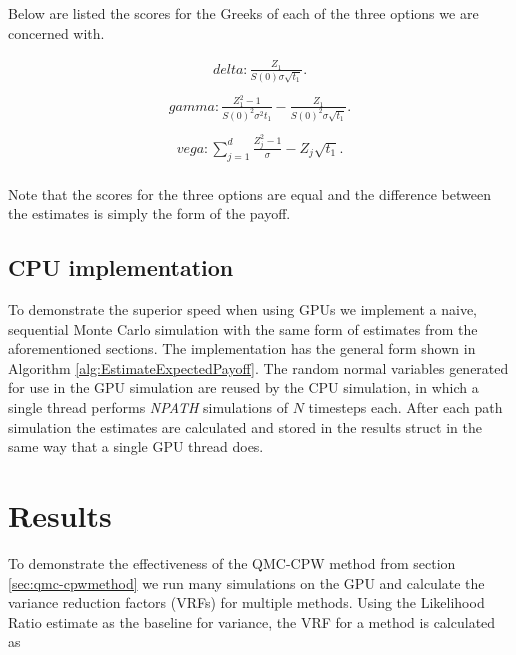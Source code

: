 Below are listed the scores for the Greeks of each of the three options we are concerned with.

\begin{equation*}
\begin{aligned}
    delta: \frac{Z_1}{S(0)\sigma\sqrt{t_1}}. \\[10pt]
\end{aligned}
\end{equation*}
\begin{equation*}
\begin{aligned}
    gamma: \frac{Z_1^2 - 1}{{S(0)}^2 \sigma^2 t_1} - \frac{Z_1}{{S(0)}^2 \sigma \sqrt{t_1}}. \\[10pt]
\end{aligned}
\end{equation*}
\begin{equation*}
\begin{aligned}
    vega: \sum_{j=1}^d{\frac{Z_j^2 - 1}{\sigma} - Z_j\sqrt{t_1}}. \\[10pt]
\end{aligned}
\end{equation*}

Note that the scores for the three options are equal and the difference between the estimates is simply the form of the payoff.

\section{CPU implementation}
To demonstrate the superior speed when using GPUs we implement a naive, sequential Monte Carlo simulation with the same form of estimates from the aforementioned sections. The implementation has the general form shown in Algorithm \ref{alg:EstimateExpectedPayoff}. The random normal variables generated for use in the GPU simulation are reused by the CPU simulation, in which a single thread performs \textit{NPATH} simulations of $N$ timesteps each. After each path simulation the estimates are calculated and stored in the results struct in the same way that a single GPU thread does.

\chapter{Results} \label{cha:Results}
To demonstrate the effectiveness of the QMC-CPW method from section \ref{sec:qmc-cpwmethod} we run many simulations on the GPU and calculate the variance reduction factors (VRFs) for multiple methods. Using the Likelihood Ratio estimate as the baseline for variance, the VRF for a method is calculated as 

